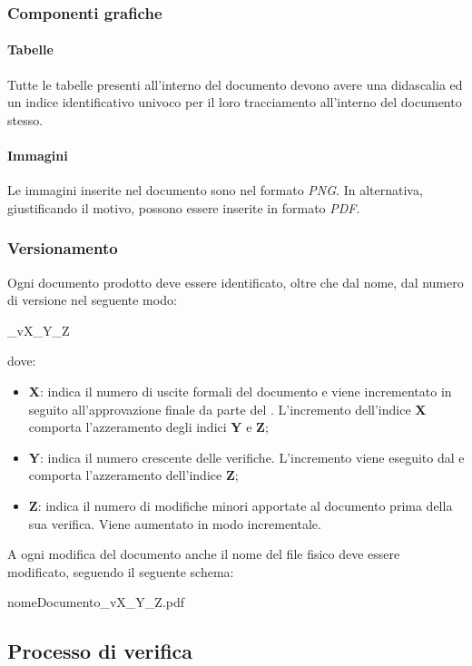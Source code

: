 \subsubsection{Componenti grafiche}
\paragraph{Tabelle}
Tutte le tabelle presenti all'interno del documento devono avere una didascalia
ed un indice identificativo univoco per il loro tracciamento all'interno del
documento stesso.
\paragraph{Immagini}
Le immagini inserite nel documento sono nel formato \textit{PNG}. In alternativa,
giustificando il motivo, possono essere inserite in formato \textit{PDF}.
\subsubsection{Versionamento}
Ogni documento prodotto deve essere identificato, oltre che dal nome, dal numero
di versione nel seguente modo:
\begin{center}
  \_vX\_Y\_Z
\end{center}
dove:

\begin{itemize}
  \item \textbf{X}: indica il numero di uscite formali del documento e viene
  incrementato in seguito all'approvazione finale da parte del \textit{\RdP}.
  L'incremento dell'indice \textbf{X} comporta l'azzeramento degli indici
  \textbf{Y} e \textbf{Z};
  \item \textbf{Y}: indica il numero crescente delle verifiche. L'incremento viene 	eseguito dal \textit{\Ver} e comporta l'azzeramento dell'indice \textbf{Z};
  \item \textbf{Z}: indica il numero di modifiche minori apportate al documento
  prima della sua verifica. Viene aumentato in modo incrementale.
  \end{itemize}
A ogni modifica del documento anche il nome del file fisico deve essere
modificato, seguendo il seguente schema:
\begin{center}
  nomeDocumento\_vX\_Y\_Z.pdf
\end{center}

\subsection{Processo di verifica}
